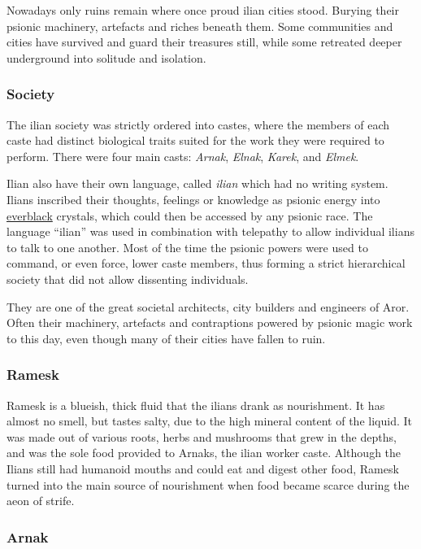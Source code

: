 Nowadays only ruins remain where once proud ilian cities stood. Burying their
psionic machinery, artefacts and riches beneath them. Some communities and
cities have survived and guard their treasures still, while some retreated
deeper underground into solitude and isolation.

\subsubsection{Society}

The ilian society was strictly ordered into castes, where the members of each
caste had distinct biological traits suited for the work they were required to
perform. There were four main casts: \emph{Arnak}, \emph{Elnak}, \emph{Karek},
and \emph{Elmek}.

Ilian also have their own language, called \emph{ilian} which had no writing
system. Ilians inscribed their thoughts, feelings or knowledge as psionic
energy into \hyperref[sec:Everblack]{everblack} crystals, which could then be
accessed by any psionic race. The language ``ilian'' was used in combination
with telepathy to allow individual ilians to talk to one another. Most of the
time the psionic powers were used to command, or even force, lower caste
members, thus forming a strict hierarchical society that did not allow
dissenting individuals.

They are one of the great societal architects, city builders and engineers of
Aror. Often their machinery, artefacts and contraptions powered by psionic
magic work to this day, even though many of their cities have fallen to ruin.

\subsubsection{Ramesk}
\label{sec:Ramesk}

Ramesk is a blueish, thick fluid that the ilians drank as nourishment. It has
almost no smell, but tastes salty, due to the high mineral content of the
liquid. It was made out of various roots, herbs and mushrooms that grew in the
depths, and was the sole food provided to Arnaks, the ilian worker caste.
Although the Ilians still had humanoid mouths and could eat and digest other
food, Ramesk turned into the main source of nourishment when food became scarce
during the aeon of strife.

\subsubsection{Arnak}
\label{sec:Arnak}

